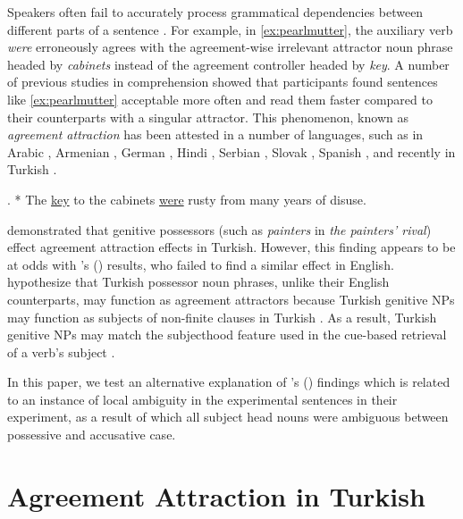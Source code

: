 \documentclass[]{interact}
\theoremstyle{plain}%
\theoremstyle{definition}
\theoremstyle{remark}
\begin{document}
Speakers often fail to accurately process grammatical dependencies between different parts of a sentence \citep[e.g.,][]{GibsonThomas:1999,PhillipsEtAl:2011}. For example, in \ref{ex:pearlmutter}, the auxiliary verb \textit{were} erroneously agrees with the agreement-wise irrelevant attractor noun phrase headed by \textit{cabinets} instead of the agreement controller headed by \textit{key}. A number of previous studies in comprehension \citep{NicolEtAl:1997, PearlmutterGarnseyBock:1999, WagersEtAl:2009} showed that participants found sentences like \ref{ex:pearlmutter} acceptable more often and read them faster compared to their counterparts with a singular attractor. This phenomenon, known as \textit{agreement attraction} \citep{BockMiller:1991} has been attested in a number of languages, such as in Arabic \citep{TuckerEtAl:2015}, Armenian \citep{AvetisyanEtAl:2020}, German \citep{LagoFelser:2018}, Hindi \citep{BhatiaDillon:2020}, Serbian \citep{RisticEtAl:2016}, Slovak \citep{BadeckerKuminiak:2007}, Spanish \citep{LagoEtAl:2015}, and recently in Turkish \citep{LagoEtAl:2019}.


\ex. \label{ex:pearlmutter} * The \underline{key} to the cabinets \underline{were} rusty from many years of disuse. 


\citet{LagoEtAl:2019} demonstrated that genitive possessors (such as \textit{painters} in \textit{the painters' rival}) effect agreement attraction effects in Turkish. However, this finding appears to be at odds with \citeauthor{NicolEtAl:2016}'s (\citeyear{NicolEtAl:2016}) results, who failed to find a similar effect in English. \citet{LagoEtAl:2019} hypothesize that Turkish possessor noun phrases, unlike their English counterparts, may function as agreement attractors because Turkish genitive NPs may function as subjects of non-finite clauses in Turkish \citep{GokselKerslake:2005,Kornfilt:2011}. As a result, Turkish genitive NPs may match the subjecthood feature used in the cue-based retrieval of a verb's subject \citep{LewisVasishth:2005, WagersEtAl:2009, ArnettWagers:2017}.

In this paper, we test an alternative explanation of \citeauthor{LagoEtAl:2019}'s (\citeyear{LagoEtAl:2019}) findings which is related to an instance of local ambiguity in the experimental sentences in their experiment, as a result of which all subject head nouns were ambiguous between possessive and accusative case.


\section{Agreement Attraction in Turkish}
\end{document}

